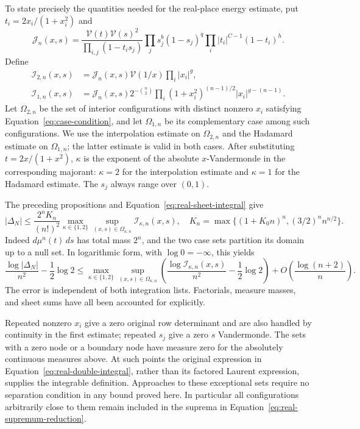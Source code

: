 To state precisely the quantities needed for the real-place energy
estimate, put $t_i=2x_i/(1+x_i^2)$ and
\[
 \mathcal J_n(x,s)=
 \frac{\mathcal V(t)\mathcal V(s)^2}{\prod_{i,j}(1-t_i s_j)}
 \prod_j s_j^b(1-s_j)^q
 \prod_i |t_i|^{C-1}(1-t_i)^h.
\]
Define
\begin{equation}\label{eq:real-integrand-majorants}
 \begin{split}
 \mathcal I_{2,n}(x,s)
   &=\mathcal J_n(x,s)\mathcal V(1/x)\prod_i|x_i|^g,\\
 \mathcal I_{1,n}(x,s)
   &=\mathcal J_n(x,s)2^{-\binom n2}
       \prod_i(1+x_i^2)^{(n-1)/2}|x_i|^{g-(n-1)}.
 \end{split}
\end{equation}
Let $\Omega_{2,n}$ be the set of interior configurations with distinct
nonzero $x_i$ satisfying Equation~\eqref{eq:case-condition}, and let
$\Omega_{1,n}$ be its complementary case among such configurations.
We use the interpolation estimate on $\Omega_{2,n}$ and the
Hadamard estimate on $\Omega_{1,n}$; the latter estimate is valid
in both cases. After substituting $t=2x/(1+x^2)$, $\kappa$ is the
exponent of the absolute $x$-Vandermonde in the corresponding
majorant: $\kappa=2$ for the interpolation estimate and
$\kappa=1$ for the Hadamard estimate.
The $s_j$ always range over $(0,1)$.

The preceding propositions and Equation~\eqref{eq:real-sheet-integral}
give
\[
 |\Delta_N|\le\frac{2^n K_n}{(n!)^2}
 \max_{\kappa\in\{1,2\}}\sup_{(x,s)\in\Omega_{\kappa,n}}
      \mathcal I_{\kappa,n}(x,s),
 \quad
 K_n=\max\{(1+K_0n)^n,(3/2)^n n^{n/2}\}.
\]
Indeed $d\mu^n(t)\,ds$ has total mass $2^n$, and the two case
sets partition its domain up to a null set.  In logarithmic form,
with $\log0=-\infty$, this yields
\begin{equation}\label{eq:real-supremum-reduction}
 \frac{\log|\Delta_N|}{n^2}-\frac12\log2
 \le\max_{\kappa\in\{1,2\}}
 \sup_{(x,s)\in\Omega_{\kappa,n}}
 \left(\frac{\log\mathcal I_{\kappa,n}(x,s)}{n^2}
                -\frac12\log2\right)
 +O\left(\frac{\log(n+2)}n\right).
\end{equation}
The error is independent of both integration lists.  Factorials,
measure masses, and sheet sums have all been accounted for explicitly.

Repeated nonzero $x_i$ give a zero original row determinant and are
also handled by continuity in the first estimate; repeated $s_j$
give a zero $s$ Vandermonde.  The sets with a zero node or a boundary
node have measure zero for the absolutely continuous measures above.
At such points the original expression in
Equation~\eqref{eq:real-double-integral}, rather than its factored
Laurent expression, supplies the integrable definition.  Approaches
to these exceptional sets require no separation condition in any
bound proved here.  In particular all configurations arbitrarily
close to them remain included in the suprema in
Equation~\eqref{eq:real-supremum-reduction}.
